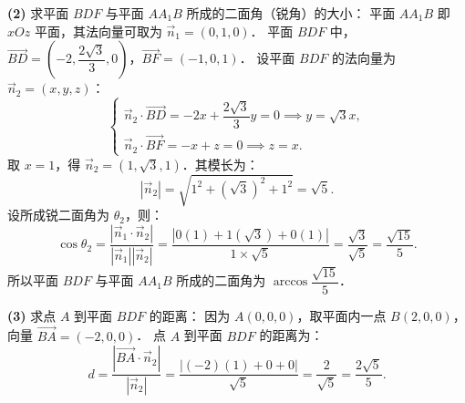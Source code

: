 \begin{answer}
\textbf{(2)}
求平面 $BDF$ 与平面 $AA_1B$ 所成的二面角（锐角）的大小：
平面 $AA_1B$ 即 $xOz$ 平面，其法向量可取为 $\vec{n}_1 = (0, 1, 0)$．
平面 $BDF$ 中，$\vec{BD} = \left(-2, \dfrac{2\sqrt{3}}{3}, 0\right)$，$\vec{BF} = (-1, 0, 1)$．
设平面 $BDF$ 的法向量为 $\vec{n}_2 = (x, y, z)$：
\nopagebreak[4]
\[
\begin{cases}
\vec{n}_2 \cdot \vec{BD} = -2x + \dfrac{2\sqrt{3}}{3}y = 0 \implies y = \sqrt{3}x, \\
\vec{n}_2 \cdot \vec{BF} = -x + z = 0 \implies z = x.
\end{cases}
\]
取 $x = 1$，得 $\vec{n}_2 = (1, \sqrt{3}, 1)$．其模长为：
\nopagebreak[4]
\[
|\vec{n}_2| = \sqrt{1^2 + (\sqrt{3})^2 + 1^2} = \sqrt{5}.
\]
设所成锐二面角为 $\theta_2$，则：
\nopagebreak[4]
\[
\cos\theta_2 = \dfrac{|\vec{n}_1 \cdot \vec{n}_2|}{|\vec{n}_1| |\vec{n}_2|} = \dfrac{|0(1) + 1(\sqrt{3}) + 0(1)|}{1 \times \sqrt{5}} = \dfrac{\sqrt{3}}{\sqrt{5}} = \dfrac{\sqrt{15}}{5}.
\]
所以平面 $BDF$ 与平面 $AA_1B$ 所成的二面角为 $\arccos\dfrac{\sqrt{15}}{5}$．

\textbf{(3)}
求点 $A$ 到平面 $BDF$ 的距离：
因为 $A(0, 0, 0)$，取平面内一点 $B(2, 0, 0)$，向量 $\vec{BA} = (-2, 0, 0)$．
点 $A$ 到平面 $BDF$ 的距离为：
\nopagebreak[4]
\[
d = \dfrac{|\vec{BA} \cdot \vec{n}_2|}{|\vec{n}_2|} = \dfrac{|(-2)(1) + 0 + 0|}{\sqrt{5}} = \dfrac{2}{\sqrt{5}} = \dfrac{2\sqrt{5}}{5}.
\]




\end{answer}
